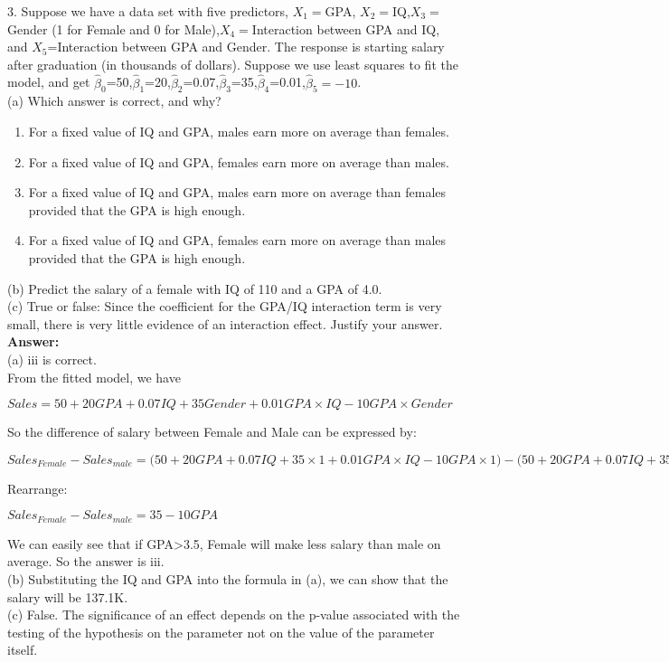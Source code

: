 \documentclass[12pt]{article}
\begin{document}
3. Suppose we have a data set with five predictors, $X_1=$GPA, $X_2=$IQ,$X_3=$Gender (1 for Female and 0 for Male),$X_4=$Interaction between GPA and IQ, and $X_5$=Interaction between GPA and Gender. The response is starting salary after graduation (in thousands of dollars). Suppose we use least squares to fit the model, and get $\hat{\beta}_0$=50,$\hat{\beta}_1$=20,$\hat{\beta}_2$=0.07,$\hat{\beta}_3$=35,$\hat{\beta}_4$=0.01,$\hat{\beta}_5=-10$. \\
(a) Which answer is correct, and why?
\begin{enumerate}[topsep=0pt,itemsep=-1ex,partopsep=1ex,parsep=1ex,label=\roman*]
 \item For a fixed value of IQ and GPA, males earn more on average than females.
 \item For a fixed value of IQ and GPA, females earn more on average than males.
 \item For a fixed value of IQ and GPA, males earn more on average than females provided that the GPA is high enough.
 \item For a fixed value of IQ and GPA, females earn more on average than males provided that the GPA is high enough.
 \end{enumerate}
(b) Predict the salary of a female with IQ of 110 and a GPA of 4.0. \\
(c) True or false: Since the coefficient for the GPA/IQ interaction term is very small, there is very little evidence of an interaction effect. Justify your answer. \\
\textbf{Answer:}\\
(a) iii is correct. \\
From the fitted model, we have 
\begin{center}
$Sales=50+20GPA+0.07IQ+35Gender+0.01GPA\times IQ-10GPA\times Gender$
\end{center}
So the difference of salary between Female and Male can be expressed by:
\begin{center}
$Sales_{Female}-Sales_{male}=\big(50+20GPA+0.07IQ+35\times 1+0.01GPA\times IQ-10GPA\times 1\big)-\big(50+20GPA+0.07IQ+35\times 0+0.01GPA\times IQ-10GPA\times 0\big)$
\end{center}
Rearrange:
\begin{center}
$Sales_{Female}-Sales_{male}=35-10GPA$
\end{center}
We can easily see that if GPA>3.5, Female will make less salary than male on average. So the answer is iii. \\
(b) Substituting the IQ and GPA into the formula in (a), we can show that the salary will be \textdollar 137.1K.\\
(c) False. The significance of an effect depends on the p-value associated with the testing of the hypothesis on the parameter not on the value of the parameter itself. \\
\end{document}
